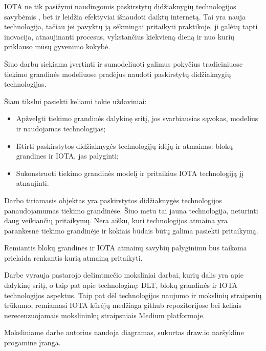 IOTA ne tik pasižymi naudingomis paskirstytų didžiaknygių technologijos savybėmis \cite{bramas2018stability}, bet ir leidžia efektyviai išnaudoti daiktų internetą. Tai yra nauja technologija, tačiau jei pavyktų ją sėkmingai pritaikyti praktikoje, ji galėtų tapti inovacija, atnaujinanti procesus, vykstančius kiekvieną dieną ir nuo kurių priklauso mūsų gyvenimo kokybė.

Šiuo darbu siekiama įvertinti ir sumodeliuoti galimus pokyčius tradiciniuose tiekimo grandinės modeliuose pradėjus naudoti paskirstytų didžiaknygių technologijas.

Šiam tikslui pasiekti keliami tokie uždaviniai:
\begin{itemize}
    \item Apžvelgti tiekimo grandinės dalykinę sritį, jos svarbiausias sąvokas, modelius ir naudojamas technologijas;
    \item Ištirti paskirstytos didžiaknygės technologijų idėją ir atmainas: blokų grandines ir IOTA, jas palyginti;
    \item Sukonstruoti tiekimo grandinės modelį ir pritaikius IOTA technologiją jį atnaujinti.
\end{itemize}

Darbo tiriamasis objektas yra paskirstytos didžiaknygės technologijos panaudojamumas tiekimo grandinėse. Šiuo metu tai jauna technologija, neturinti daug veikiančių pritaikymų. Nėra aišku, kuri technologijos atmaina yra parankesnė tiekimo grandinėje ir kokiais būdais būtų galima pasiekti pritaikymą.

Remiantis blokų grandinės ir IOTA atmainų savybių palyginimu bus taikoma prielaida renkantis kurią atmainą pritaikyti.

Darbe vyrauja pastarojo dešimtmečio moksliniai darbai, kurių dalis yra apie dalykinę sritį, o taip pat apie technologinę:  DLT, blokų grandinės ir IOTA technologijos aspektus. Taip pat dėl technologijos naujumo ir mokslinių straipsnių trūkumo, remiamasi IOTA kūrėjų medžiaga github repozitorijose bei keliais nerecenzuojamais mokslininkų straipsniais Medium platformoje.

Moksliniame darbe autorius naudoja diagramas, sukurtas draw.io naršykline progamine įranga.

